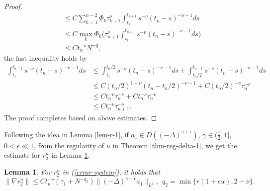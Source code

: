 \documentclass[11pt]{article}
\newtheorem{lemma}{Lemma}[section]
\numberwithin{equation}{section}
\begin{document}
\begin{proof}
\begin{align*}
&\le C\sum_{k=1}^{n-2}\Phi_k\tau_{k+1}^\nu \int_{t_k}^{t_{k+1}}s^{-\nu}(t_n-s)^{-\nu-1}ds\\
&\le C\max_k\Phi_k\bigg(\tau_{n+1}^\nu \int_{t_1}^{t_{n-1}}s^{-\nu}(t_n-s)^{-\nu-1}ds\bigg)\\
&\le Ct_n^{-\nu}N^{-q},
\end{align*}
the last inequality holds by 
\begin{align*}
\int_{t_1}^{t_{n-1}}s^{-\nu}(t_n-s)^{-\nu-1}ds
&\le \int_{t_1}^{t_{n}/2}s^{-\nu}(t_n-s)^{-\nu-1}ds+\int_{t_{n}/2}^{t_{n-1}}s^{-\nu}(t_n-s)^{-\nu-1}ds\\
&\le C(t_n/2)^{1-\nu}(t_n-t_n/2)^{-\nu-1}+C(t_n/2)^{-\nu}\tau_n^{-\nu}\\
&\le Ct_n^{-\nu}\tau_n^{-\nu}+Ct_n^{-\nu}\tau_n^{-\nu}\\
&\le Ct_n^{-\nu}\tau_{n+1}^{-\nu}.
\end{align*}
The proof completes based on above estimates.
\end{proof}

Following the idea in Lemma \ref{lem-r-1}, if $a_1\in D((-\Delta)^{\gamma+\epsilon})$, $\gamma\in(\frac12,1]$, $0<\epsilon \ll 1$, from the regularity of $u$ in Theorem \ref{thm-reg-delta-1}, we get the estimate for $r_2^n$ in Lemma \ref{lem-r-2}.
\begin{lemma}\label{lem-r-2}
For $r_2^n$ in (\ref{error-system}), it holds that
\[
\|\nabla r_2^n\| \le Ct_n^{-\nu}(\tau_1+N^{-q_2})\|(-\Delta)^{\gamma+\epsilon}a_1\|_{L^2},~~q_2=\min\{r(1+\epsilon\alpha),2-\nu\}.
\]
\end{lemma}
\end{document}
